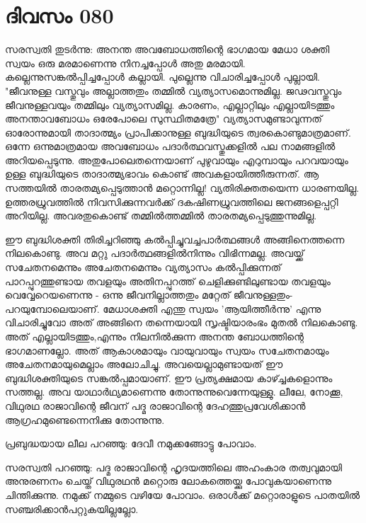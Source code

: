  
\section{ദിവസം 080}


സരസ്വതി തുടര്‍ന്നു: അനന്ത അവബോധത്തിന്റെ ഭാഗമായ മേധാ ശക്തി സ്വയം ഒരു മരമാണെന്നു നിനച്ചപ്പോള്‍ അതു മരമായി. കല്ലെന്നുസങ്കല്‍പ്പിച്ചപ്പോള്‍ കല്ലായി. പുല്ലെന്നു വിചാരിച്ചപ്പോള്‍ പുല്ലായി. "ജീവനുള്ള വസ്തുവും അല്ലാത്തതും തമ്മില്‍ വ്യത്യാസമൊന്നുമില്ല. ജഢവസ്തുവും ജീവനുള്ളവയും തമ്മിലും വ്യത്യാസമില്ല. കാരണം, എല്ലാറ്റിലും എല്ലായിടത്തും അനന്താവബോധം ഒരേപോലെ സുസ്ഥിതമത്രേ" വ്യത്യാസമുണ്ടാവുന്നത്‌ ഓരോന്നുമായി താദാത്മ്യം പ്രാപിക്കാനുള്ള ബുദ്ധിയുടെ ത്വരകൊണ്ടുമാത്രമാണ്‌. ഒന്നേ ഒന്നുമാത്രമായ അവബോധം പദാര്‍ത്ഥവസ്തുക്കളില്‍ പല നാമങ്ങളില്‍ അറിയപ്പെടുന്നു. അതുപോലെതന്നെയാണ്‌ പുഴുവായും എറുമ്പായും പറവയായും ഉള്ള ബുദ്ധിയുടെ താദാത്മ്യഭാവം കൊണ്ട്‌ അവകളായിത്തീരുന്നത്‌. ആ സത്തയില്‍ താരതമ്യപ്പെടുത്താന്‍ മറ്റൊന്നില്ല! വ്യതിരിക്തതയെന്ന ധാരണയില്ല. ഉത്തരധ്രുവത്തില്‍ നിവസിക്കുന്നവര്‍ക്ക്‌ ദകഷിണധ്രുവത്തിലെ ജനങ്ങളെപ്പറ്റി അറിയില്ല. അവരതുകൊണ്ട്‌ തമ്മില്‍ത്തമ്മില്‍ താരതമ്യപ്പെടുത്തുന്നുമില്ല. 

ഈ ബുദ്ധിശക്തി തിരിച്ചറിഞ്ഞു കല്‍പ്പിച്ചുവച്ചപാര്‍ത്ഥങ്ങള്‍ അങ്ങിനെത്തന്നെ നിലകൊണ്ടു. അവ മറ്റു പദാര്‍ത്ഥങ്ങളില്‍നിന്നും വിഭിന്നമല്ല. അവയ്ക്ക്‌ സചേതനമെന്നും അചേതനമെന്നും വ്യത്യാസം കല്‍പ്പിക്കുന്നത്‌ പാറപ്പുറത്തുണ്ടായ തവളയും അതിനപ്പുറത്ത്‌ ചെളിക്കുണ്ടിലുണ്ടായ തവളയും വെവ്വേറെയണെന്നു - ഒന്നു ജീവനില്ലാത്തതും മറ്റേത്‌ ജീവനുള്ളതും-പറയുമ്പോലെയാണ്‌. മേധാശക്തി എന്തു സ്വയം 'ആയിത്തീര്‍ന്നു' എന്നു വിചാരിച്ചുവോ അത്‌ അങ്ങിനെ തന്നെയായി സൃഷ്ടിയാരംഭം മുതല്‍ നിലകൊണ്ടു. അത്‌ എല്ലായിടത്തും,എന്നും നിലനില്‍ക്കുന്ന അനന്ത ബോധത്തിന്റെ ഭാഗമാണല്ലോ. അത്‌ ആകാശമായും വായുവായും സ്വയം സചേതനമായും അചേതനമായുമെല്ലാം അലോചിച്ചു. അവയെല്ലാമുണ്ടായത്‌ ഈ ബുദ്ധിശക്തിയുടെ സങ്കല്‍പ്പമായാണ്‌. ഈ പ്രത്യക്ഷമായ കാഴ്ച്ചകളൊന്നും സത്തല്ല. അവ യാഥാര്‍ഥ്യമാണെന്നു തോന്നുന്നുവെന്നേയുള്ളു. 
ലീലേ, നോക്കൂ, വിഥുരഥ രാജാവിന്റെ ജീവന്‌ പദ്മ രാജാവിന്റെ ദേഹത്തുപ്രവേശിക്കാന്‍ ആഗ്രഹമുണ്ടെന്നെനിക്കു തോന്നുന്നു.

പ്രബുദ്ധയായ ലീല പറഞ്ഞു: ദേവീ നമുക്കങ്ങോട്ടു പോവാം.

സരസ്വതി പറഞ്ഞു: പദ്മ രാജാവിന്റെ ഹൃദയത്തിലെ അഹംകാര തത്വവുമായി അനുരണനം ചെയ്ത്‌ വിഥുരഥന്‍ മറ്റൊരു ലോകത്തെയ്ക്കു പോവുകയാണെന്നു ചിന്തിക്കുന്നു. നമുക്ക്‌ നമ്മുടെ വഴിയേ പോവാം. ഒരാള്‍ക്ക്‌ മറ്റൊരാളുടെ പാതയില്‍ സഞ്ചരിക്കാന്‍പറ്റുകയില്ലല്ലോ.  
